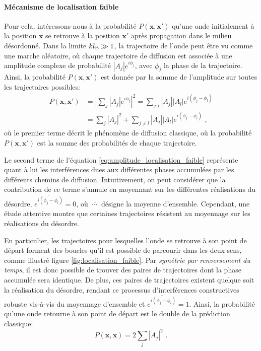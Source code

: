 \paragraph*{Mécanisme de localisation faible}
Pour cela, intéressons-nous à la probabilité $P(\mathbf{x},\mathbf{x}')$ qu'une onde initialement à la position $\mathbf{x}$ se retrouve à la position $\mathbf{x}'$ après propagation dans le milieu désordonné. Dans la limite $kl_{\mathrm{B}}\gg 1$, la trajectoire de l'onde peut être vu comme une marche aléatoire, où chaque trajectoire de diffusion est associée à une amplitude complexe de probabilité $\left| A_j \right| e^{i \phi_j}$, avec $\phi_j$ la phase de la trajectoire. Ainsi, la probabilité $P(\mathbf{x},\mathbf{x}')$ est donnée par la somme de l'amplitude sur toutes les trajectoires possibles:
\begin{align}
P(\mathbf{x},\mathbf{x}') \nonumber&= {\left| \sum_j{ \left|A_j\right| e^{i \phi_j} }\right| }^2 = \sum_{j,l} {\left| A_j \right| \left| A_l \right| e^{i (\phi_j - \phi_l)}} \\
&= \sum_j{{\left| A_j \right|}^2} + \sum_{j\neq l}{\left| A_j \right| \left|A_l \right| e^{i(\phi_j - \phi_l)}} \text{ ,}
\label{eq:amplitude_localisation_faible}
\end{align}
où le premier terme décrit le phénomène de diffusion classique, où la probabilité $P(\mathbf{x},\mathbf{x}')$ est la somme des probabilités de chaque trajectoire. 

Le second terme de l'équation \ref{eq:amplitude_localisation_faible} représente quant à lui les interférences dues aux différentes phases accumulées par les différents chemins de diffusion. Intuitivement, on peut considérer que la contribution de ce terme s'annule en moyennant sur les différentes réalisations du désordre, $\overline{e^{i(\phi_j - \phi_l)}}=0$, où $\overline{\:\cdots\:}$ désigne la moyenne d'ensemble. Cependant, une étude attentive montre que certaines trajectoires résistent au moyennage sur les réalisations du désordre.

En particulier, les trajectoires pour lesquelles l'onde se retrouve à son point de départ forment des boucles qu'il est possible de parcourir dans les deux sens, comme illustré figure \ref{fig:localisation_faible}. Par \emph{symétrie par renversement du temps}, il est donc possible de trouver des paires de trajectoires dont la phase accumulée sera identique. De plus, ces paires de trajectoires existent quelque soit la réalisation du désordre, rendant ce processus d'interférences constructives robuste vis-à-vis du moyennage d'ensemble et $\overline{e^{i(\phi_j - \phi_l)}}=1$. Ainsi, la probabilité qu'une onde retourne à son point de départ est le double de la prédiction classique:
\begin{equation}
P(\mathbf{x},\mathbf{x})=2 \sum_j{{\left| A_j \right|}^2} \text{ .}
\label{eq:proba_retour_origine}
\end{equation}

